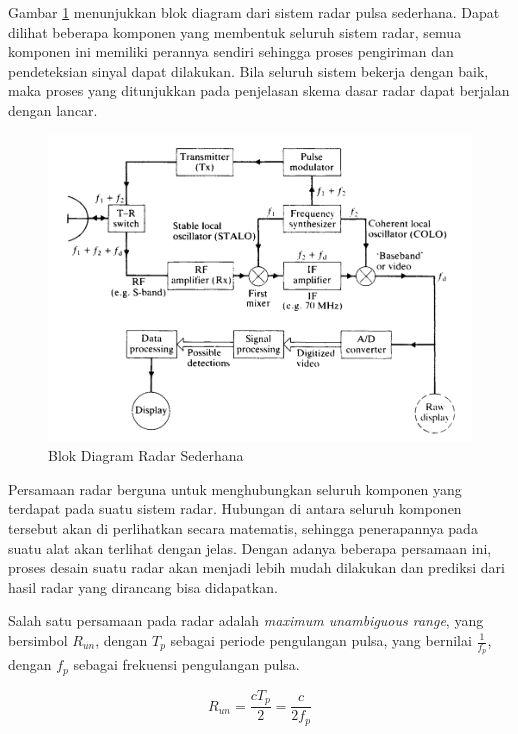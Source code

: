 Gambar \ref{pic:blokdiagram} menunjukkan blok diagram dari sistem radar pulsa sederhana. Dapat dilihat beberapa komponen yang membentuk seluruh sistem radar, semua komponen ini memiliki perannya sendiri sehingga proses pengiriman dan pendeteksian sinyal dapat dilakukan.  Bila seluruh sistem bekerja dengan baik, maka proses yang ditunjukkan pada penjelasan skema dasar radar dapat berjalan dengan lancar.

\begin{figure}
	\begin{center}
		\includegraphics[scale=0.35]{pics/bab2/blokdiagram.png} 
		\caption[Blok Diagram Radar]{{Blok Diagram Radar Sederhana \cite{Kingsley1999}}}
		\label{pic:blokdiagram}
	\end{center}
\end{figure}

Persamaan radar berguna untuk menghubungkan seluruh komponen yang terdapat pada suatu sistem radar. Hubungan di antara seluruh komponen tersebut akan di perlihatkan secara matematis, sehingga penerapannya pada suatu alat akan terlihat dengan jelas. Dengan adanya beberapa persamaan ini, proses desain suatu radar akan menjadi lebih mudah dilakukan dan prediksi dari hasil radar yang dirancang bisa didapatkan.

Salah satu persamaan pada radar adalah \textit{maximum unambiguous range}, yang bersimbol $R_{un}$, dengan $T_{p}$ sebagai periode pengulangan pulsa, yang bernilai $\frac{1}{f_{p}}$, dengan $f_{p}$ sebagai frekuensi pengulangan pulsa.

\begin{equation}
	R_{un} = \frac{cT_{p}}{2} = \frac{c}{2f_{p}}
\end{equation}

